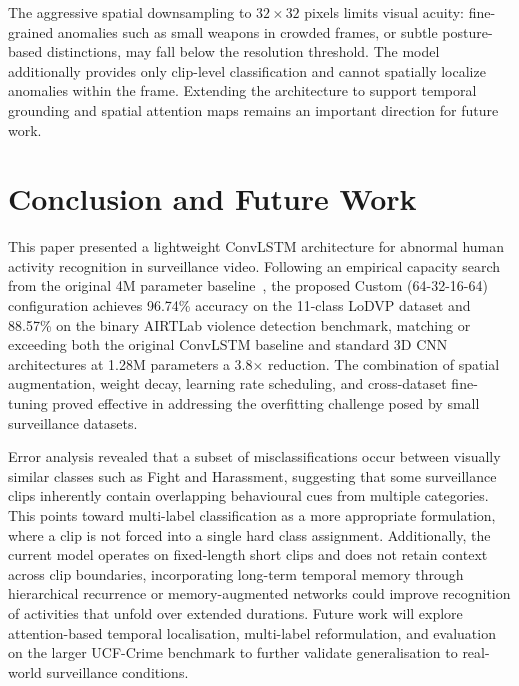 \documentclass[11pt,a4paper]{article}
\begin{document}
	The aggressive spatial downsampling to $32 \times 32$ pixels limits visual acuity: fine-grained anomalies such as small weapons in crowded frames, or subtle posture-based distinctions, may fall below the resolution threshold. The model additionally provides only clip-level classification and cannot spatially localize anomalies within the frame. Extending the architecture to support temporal grounding and spatial attention maps remains an important direction for future work.

	\section{Conclusion and Future Work}

	This paper presented a lightweight ConvLSTM architecture for abnormal human activity 
	recognition in surveillance video. Following an empirical capacity search from the 
	original 4M parameter baseline~\cite{vrskova2022}, the proposed Custom 
	(64-32-16-64) configuration achieves 96.74\% accuracy on the 11-class LoDVP dataset 
	and 88.57\% on the binary AIRTLab violence detection benchmark, matching or exceeding 
	both the original ConvLSTM baseline and standard 3D CNN architectures at 1.28M 
	parameters a 3.8$\times$ reduction. The combination of spatial augmentation, weight 
	decay, learning rate scheduling, and cross-dataset fine-tuning proved effective in 
	addressing the overfitting challenge posed by small surveillance datasets.

	Error analysis revealed that a subset of misclassifications occur between visually 
	similar classes such as Fight and Harassment, suggesting that some surveillance clips 
	inherently contain overlapping behavioural cues from multiple categories. This points 
	toward multi-label classification as a more appropriate formulation, where a clip is 
	not forced into a single hard class assignment. Additionally, the current model operates 
	on fixed-length short clips and does not retain context across clip boundaries,
	incorporating long-term temporal memory through hierarchical recurrence or memory-augmented 
	networks could improve recognition of activities that unfold over extended durations. 
	Future work will explore attention-based temporal localisation, multi-label reformulation, 
	and evaluation on the larger UCF-Crime benchmark to further validate generalisation to 
	real-world surveillance conditions.


	
	
\end{document}
